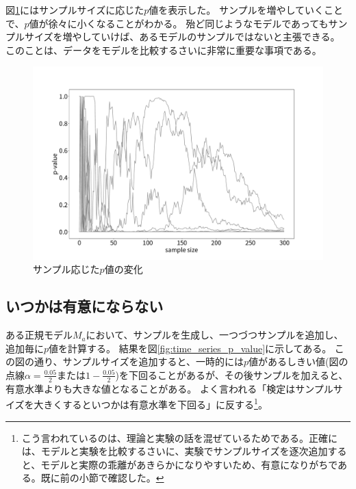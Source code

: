 図\ref{fig:time_series_p_value_depends_sample_size}にはサンプルサイズに応じた$p$値を表示した。
サンプルを増やしていくことで、$p$値が徐々に小くなることがわかる。
殆ど同じようなモデルであってもサンプルサイズを増やしていけば、あるモデルのサンプルではないと主張できる。
このことは、データをモデルを比較するさいに非常に重要な事項である。
\begin{figure}
 \begin{center}
  \includegraphics[width=15cm]{./image/04_/p_sample_size.pdf}
  \caption{サンプル応じた$p$値の変化}
  \label{fig:time_series_p_value_depends_sample_size}
 \end{center}
\end{figure}



\subsection{いつかは有意にならない}
ある正規モデル$M_a$において、サンプルを生成し、一つづつサンプルを追加し、追加毎に$p$値を計算する。
結果を図\ref{fig:time_series_p_value}に示してある。
この図の通り、サンプルサイズを追加すると、一時的には$p$値があるしきい値(図の点線$\alpha=\frac{0.05}{2}$または$1-\frac{0.05}{2}$)を下回ることがあるが、その後サンプルを加えると、有意水準よりも大きな値となることがある。
よく言われる「検定はサンプルサイズを大きくするといつかは有意水準を下回る」に反する\footnote{こう言われているのは、理論と実験の話を混ぜているためである。正確には、モデルと実験を比較するさいに、実験でサンプルサイズを逐次追加すると、モデルと実際の乖離があきらかになりやすいため、有意になりがちである。既に前の小節で確認した。}。

